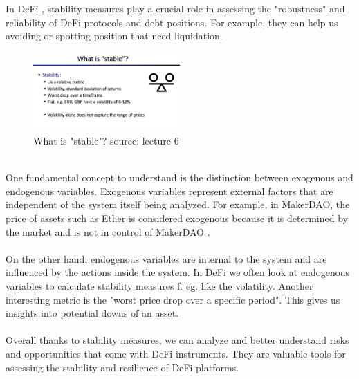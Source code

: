 \documentclass{article}
\begin{document}
In DeFi , stability measures play a crucial role in assessing the "robustness" and reliability of DeFi protocols and debt positions. For example, they can help us avoiding or spotting position that need liquidation.\begin{figure}[h]
    \centering
    \includegraphics[width=0.5\textwidth]{Bildschirmfoto 2024-04-07 um 17.44.29.png} 
    \caption{What is "stable"? \scriptsize{source: lecture 6}}
    \label{fig:DoS-attack}
\end{figure}\\
One fundamental concept to understand is the distinction between exogenous and endogenous variables. Exogenous variables represent external  factors that are independent of the system itself being analyzed. For example, in MakerDAO, the price of assets such as Ether is considered exogenous because it is determined by the market and is not in control of MakerDAO .\\\\On the other hand, endogenous variables are internal to the system and are influenced by the actions inside the system. In DeFi we often look at endogenous variables to calculate stability measures f. eg. like the volatility. Another interesting metric is the  "worst price drop over a specific period". This gives us insights into potential downs of an asset. \\\\ Overall thanks to stability measures, we can analyze and better understand risks and opportunities that come with DeFi instruments. They are valuable tools for assessing the stability and resilience of DeFi platforms.\\
\end{document}
